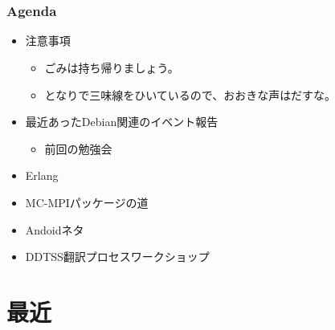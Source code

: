 \section{}
\begin{frame}
 \frametitle{Agenda}
\begin{minipage}[t]{0.45\hsize}
  \begin{itemize}
  \item 注意事項
	\begin{itemize}
	 \item ごみは持ち帰りましょう。
	 \item となりで三味線をひいているので、おおきな声はだすな。
	\end{itemize}
  \item 最近あったDebian関連のイベント報告
	\begin{itemize}
	 \item 前回の勉強会
	\end{itemize}
 \end{itemize}
\end{minipage} 
\begin{minipage}[t]{0.45\hsize}
 \begin{itemize}
  \item Erlang
  \item MC-MPIパッケージの道
  \item Andoidネタ
  \item DDTSS翻訳プロセスワークショップ
 \end{itemize}
\end{minipage}
\end{frame}

\section{最近}

